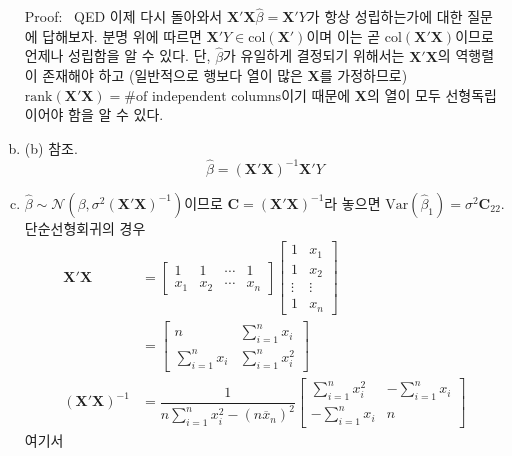 \documentclass[answers]{exam}
\newcommand{\bs}{\boldsymbol}
\newenvironment{proof}{{\sc Proof:}}{~\hfill QED}
\begin{document}
\begin{questions}
\begin{solution}
\begin{enumerate}[(a)]
\begin{proof}
      \end{proof}
      이제 다시 돌아와서 $\mathbf{X}'\mathbf{X}\widehat{\beta}=\mathbf{X}'Y$가 항상 성립하는가에 대한 질문에 답해보자. 분명 위에 따르면 $\mathbf{X}'Y\in\bs{\mathrm{col}}\left(\mathbf{X}'\right)$이며 이는 곧 $\bs{\mathrm{col}}\left(\mathbf{X}'\mathbf{X}\right)$이므로 언제나 성립함을 알 수 있다. 단, $\widehat{\beta}$가 유일하게 결정되기 위해서는 $\mathbf{X}'\mathbf{X}$의 역행렬이 존재해야 하고 (일반적으로 행보다 열이 많은 $\mathbf{X}$를 가정하므로) $\bs{\mathrm{rank}}\left(\mathbf{X}'\mathbf{X}\right)=\text{\# of independent columns}$이기 때문에 $\mathbf{X}$의 열이 모두 선형독립이어야 함을 알 수 있다.
      \item (b) 참조.
      \begin{equation}
        \widehat{\beta}=\left(\mathbf{X}'\mathbf{X}\right)^{-1}\mathbf{X}'Y
      \end{equation}
      \item $\widehat{\beta}\sim\mathcal{N}\left(\beta,\sigma^{2}\left(\mathbf{X}'\mathbf{X}\right)^{-1}\right)$이므로 $\mathbf{C}=\left(\mathbf{X}'\mathbf{X}\right)^{-1}$라 놓으면 $\mathrm{Var}\left(\widehat{\beta}_{1}\right)=\sigma^{2}\mathbf{C}_{22}$. 단순선형회귀의 경우
      \begin{align}
        \mathbf{X}'\mathbf{X} &= \begin{bmatrix}1 & 1 &\cdots & 1\\ x_{1} &x_{2} & \cdots & x_{n}\end{bmatrix}\begin{bmatrix}1& x_{1}\\ 1 & x_{2} \\ \vdots & \vdots \\ 1 & x_{n}\end{bmatrix}\\
        &= \begin{bmatrix}n & \sum_{i=1}^{n}x_{i}\\ \sum_{i=1}^{n}x_{i} & \sum_{i=1}^{n}x_{i}^{2}\end{bmatrix}\\
        \left(\mathbf{X}'\mathbf{X}\right)^{-1} &= \dfrac{1}{n\sum_{i=1}^{n}x_{i}^{2}-\left(n\overline{x}_{n}\right)^{2}}\begin{bmatrix}\sum_{i=1}^{n}x_{i}^{2}& -\sum_{i=1}^{n}x_{i}\\ -\sum_{i=1}^{n}x_{i} & n \end{bmatrix}
      \end{align}
      여기서
      \begin{equation}

\end{equation}
\end{enumerate}
\end{solution}
\end{questions}
\end{document}
